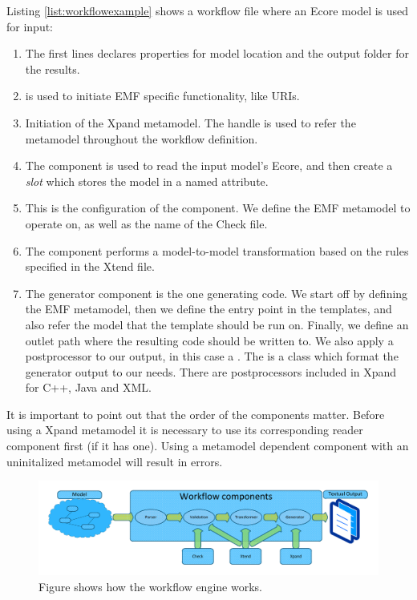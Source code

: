 Listing \ref{list:workflowexample} shows a workflow file where an Ecore model is used for input:
\begin{enumerate}
  \item The first lines declares properties for model location and the output folder for the results.
  \item {} is used to initiate EMF specific functionality, like  URIs.
  \item Initiation of the Xpand metamodel. The handle  is used to refer the metamodel throughout the workflow definition.
  \item The  component is used to read the input model's Ecore, and then create a \emph{slot} which stores the model in a named attribute.
  \item This is the configuration of the  component. We define the EMF metamodel to operate on, as well as the name of the Check file.
  \item The  component performs a model-to-model transformation based on the rules specified in the Xtend file.
  \item The generator component is the one generating code. We start off by defining the EMF metamodel, then we define the entry point in the templates, and also refer the model that the template should be run on. Finally, we define an outlet path where the resulting code should be written to. We also apply a postprocessor to our output, in this case a . The  is a class which format the generator output to our needs. There are postprocessors included in Xpand for C++, Java and XML.
\end{enumerate} 

It is important to point out that the order of the components matter. Before using a Xpand metamodel it is necessary to use its corresponding reader component first (if it has one). Using a metamodel dependent component with an uninitalized metamodel will result in errors.

\begin{figure}[htpb]
  \centering
  \centerline{\includegraphics[scale=0.8]{images/xpandworkflow.pdf}}
  \caption[Workflow in Xpand]{Figure shows how the workflow engine works.}
  \label{fig:xpand_workflow}
\end{figure}


